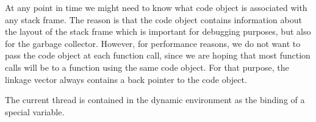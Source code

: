 At any point in time we might need to know what code object is
associated with any stack frame.  The reason is that the code object
contains information about the layout of the stack frame which is
important for debugging purposes, but also for the garbage collector.
However, for performance reasons, we do not want to pass the code
object at each function call, since we are hoping that most function
calls will be to a function using the same code object.  For that
purpose, the linkage vector always contains a back pointer to the code
object. 

The current thread is contained in the dynamic environment as the
binding of a special variable.
